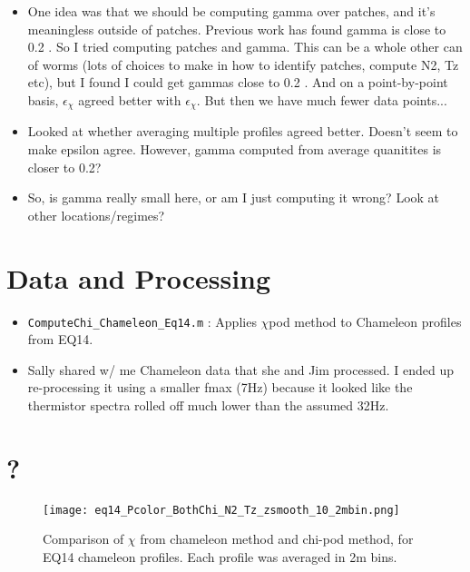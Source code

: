 \documentclass[11pt]{article}
\begin{document}
\begin{itemize}
\item One idea was that we should be computing gamma over patches, and it's meaningless outside of patches. Previous work has found gamma is close to 0.2 . So I tried computing patches and gamma. This can be a whole other can of worms (lots of choices to make in how to identify patches, compute N2, Tz etc), but I found I could get gammas close to 0.2 .  And on a point-by-point basis, $\epsilon_{\chi}$ agreed better with $\epsilon_{\chi}$. But then we have much fewer data points... 

\item Looked at whether averaging multiple profiles agreed better. Doesn't seem to make epsilon agree. However, gamma computed from average quanitites is closer to 0.2?

\item So, is gamma really small here, or am I just computing it wrong? Look at other locations/regimes?

\end{itemize}




\clearpage
\section{Data and Processing}

\begin{itemize}
\item \verb+ComputeChi_Chameleon_Eq14.m+ : Applies $\chi$pod method to Chameleon profiles from EQ14.
\item Sally shared w/ me Chameleon data that she and Jim processed. I ended up re-processing it using a smaller fmax (7Hz) because it looked like the thermistor spectra rolled off much lower than the assumed 32Hz.
\end{itemize}




\clearpage
\section{?}

\begin{figure}[htbp]
\texttt{[image: eq14\_Pcolor\_BothChi\_N2\_Tz\_zsmooth\_10\_2mbin.png]}
\caption{Comparison of $\chi$ from chameleon method and chi-pod method, for EQ14 chameleon profiles. Each profile was averaged in 2m bins.  }
\label{chi_overview}
\end{figure}
\end{document}
